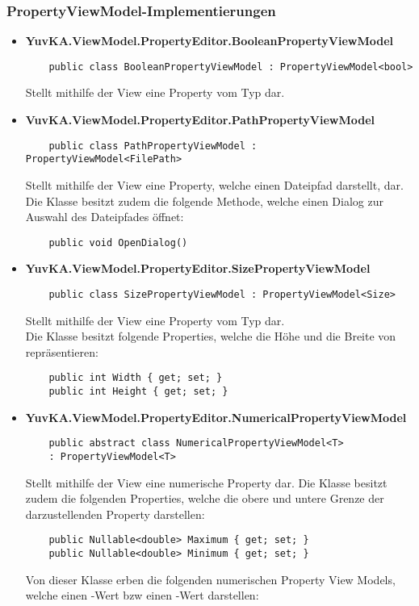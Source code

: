 \subsubsection{PropertyViewModel-Implementierungen}

\begin{itemize}

\item{\textbf{YuvKA.ViewModel.PropertyEditor.BooleanPropertyViewModel}}
	\begin{verbatim}
	public class BooleanPropertyViewModel : PropertyViewModel<bool>
	\end{verbatim}
	Stellt mithilfe der View eine Property vom Typ  dar.

\item{\textbf{VuvKA.ViewModel.PropertyEditor.PathPropertyViewModel}}
	\begin{verbatim}
	public class PathPropertyViewModel : PropertyViewModel<FilePath>
	\end{verbatim}
	Stellt mithilfe der View eine Property, welche einen Dateipfad darstellt, dar.\\
	Die Klasse besitzt zudem die folgende Methode, welche einen Dialog zur Auswahl des Dateipfades öffnet:
	\begin{verbatim}
	public void OpenDialog()
	\end{verbatim}

\item{\textbf{YuvKA.ViewModel.PropertyEditor.SizePropertyViewModel}}
	\begin{verbatim}
	public class SizePropertyViewModel : PropertyViewModel<Size>
	\end{verbatim}
	Stellt mithilfe der View eine Property vom Typ  dar.\\
	Die Klasse besitzt folgende Properties, welche die Höhe und die Breite von  repräsentieren:
	\begin{verbatim}
	public int Width { get; set; }
	public int Height { get; set; } 
	\end{verbatim}

\item{\textbf{YuvKA.ViewModel.PropertyEditor.NumericalPropertyViewModel}}
	\begin{verbatim}
	public abstract class NumericalPropertyViewModel<T> 
	: PropertyViewModel<T>
	\end{verbatim}
	Stellt mithilfe der View eine numerische Property dar. Die Klasse besitzt zudem die folgenden Properties, welche die obere und untere Grenze der darzustellenden Property darstellen:
	\begin{verbatim}
	public Nullable<double> Maximum { get; set; }
	public Nullable<double> Minimum { get; set; }
	\end{verbatim}
	Von dieser Klasse erben die folgenden numerischen Property View Models, welche einen -Wert bzw einen -Wert darstellen:


\end{itemize}
